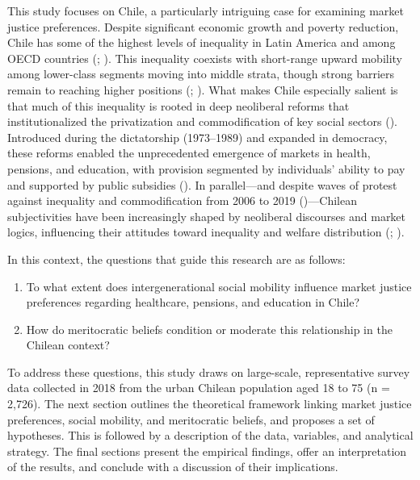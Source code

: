 \documentclass[
  13pt,
]{article}
\providecommand{\tightlist}{%
  \setlength{\itemsep}{0pt}\setlength{\parskip}{0pt}}\usepackage{longtable,booktabs,array}
\begin{document}
This study focuses on Chile, a particularly intriguing case for
examining market justice preferences. Despite significant economic
growth and poverty reduction, Chile has some of the highest levels of
inequality in Latin America and among OECD countries
(;
). This inequality
coexists with short-range upward mobility among lower-class segments
moving into middle strata, though strong barriers remain to reaching
higher positions (; ). What makes Chile especially salient is that much of this
inequality is rooted in deep neoliberal reforms that institutionalized
the privatization and commodification of key social sectors
(). Introduced
during the dictatorship (1973--1989) and expanded in democracy, these
reforms enabled the unprecedented emergence of markets in health,
pensions, and education, with provision segmented by individuals'
ability to pay and supported by public subsidies
(). In parallel---and
despite waves of protest against inequality and commodification from
2006 to 2019 ()---Chilean subjectivities have been increasingly shaped by
neoliberal discourses and market logics, influencing their attitudes
toward inequality and welfare distribution
(;
).

In this context, the questions that guide this research are as follows:

\begin{enumerate}
\def\labelenumi{(\arabic{enumi})}
\tightlist
\item
  To what extent does intergenerational social mobility influence market
  justice preferences regarding healthcare, pensions, and education in
  Chile?
\item
  How do meritocratic beliefs condition or moderate this relationship in
  the Chilean context?
\end{enumerate}

To address these questions, this study draws on large-scale,
representative survey data collected in 2018 from the urban Chilean
population aged 18 to 75 (n = 2,726). The next section outlines the
theoretical framework linking market justice preferences, social
mobility, and meritocratic beliefs, and proposes a set of hypotheses.
This is followed by a description of the data, variables, and analytical
strategy. The final sections present the empirical findings, offer an
interpretation of the results, and conclude with a discussion of their
implications.
\end{document}
